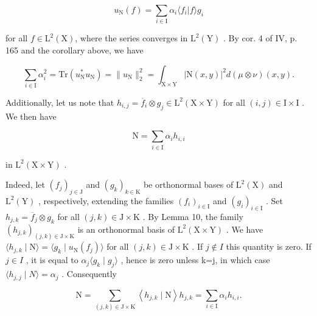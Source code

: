 \[
u _ {\mathrm{N}} (f) = \sum_ {i \in \mathrm{I}} \alpha_ {i} \langle f _ {i} | f \rangle g _ {i}
\]

for all \(f \in \mathrm{L}^2(\mathrm{X})\), where the series converges in \(\mathrm{L}^2(\mathrm{Y})\) . By cor. 4 of IV, p. 165 and the corollary above, we have

\[
\sum_ {i \in \mathrm{I}} \alpha_ {i} ^ {2} = \mathrm{Tr} (u _ {\mathrm{N}} ^ {*} u _ {\mathrm{N}}) = \| u _ {\mathrm{N}} \| _ {2} ^ {2} = \int_ {\mathrm{X} \times \mathrm{Y}} | \mathrm{N} (x, y) | ^ {2} d (\mu \otimes \nu) (x, y).
\]

Additionally, let us note that \(h_{i,j} = \overline{f}_{i} \otimes g_{j} \in \mathrm{L}^{2}(\mathrm{X} \times \mathrm{Y})\) for all \((i, j) \in \mathrm{I} \times \mathrm{I}\) . We then have

\[
\mathrm{N} = \sum_ {i \in \mathrm{I}} \alpha_ {i} h _ {i, i}
\]

in \(\mathrm{L}^2 (\mathrm{X}\times \mathrm{Y})\) .

Indeed, let \((f_{j})_{j\in\mathrm{J}}\) and \((g_{k})_{k\in\mathrm{K}}\) be orthonormal bases of \(\mathrm{L}^{2}(\mathrm{X})\) and \(\mathrm{L}^{2}(\mathrm{Y})\) , respectively, extending the families \((f_{i})_{i\in\mathrm{I}}\) and \((g_{i})_{i\in\mathrm{I}}\) . Set \(h_{j,k}=\overline{f}_{j}\otimes g_{k}\) for all \((j,k)\in\mathrm{J}\times\mathrm{K}\) . By Lemma 10, the family \((h_{j,k})_{(j,k)\in\mathrm{J}\times\mathrm{K}}\) is an orthonormal basis of \(\mathrm{L}^{2}(\mathrm{X}\times\mathrm{Y})\) . We have \(\langle h_{j,k}\mid\mathrm{N}\rangle=\langle g_{k}\mid u_{\mathrm{N}}(f_{j})\rangle\) for all \((j,k)\in\mathrm{J}\times\mathrm{K}\) . If \(j\notin I\) this quantity is zero. If \(j\in I\) , it is equal to \(\alpha_{j}\langle g_{k}\mid g_{j}\rangle\) , hence is zero unless k=j, in which case \(\langle h_{j,j}\mid N\rangle=\alpha_{j}\) . Consequently

\[
\mathrm{N} = \sum_ {(j, k) \in \mathrm{J} \times \mathrm{K}} \left\langle h _ {j, k} \mid \mathrm{N} \right\rangle h _ {j, k} = \sum_ {i \in \mathrm{I}} \alpha_ {i} h _ {i, i}.
\]

